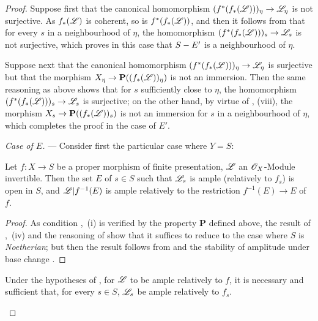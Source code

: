 \begin{proof}
Suppose first that the canonical homomorphism $(f^*(f_*(\mathscr{L})))_\eta\to\mathscr{L}_\eta$ is not surjective.
As $f_*(\mathscr{L})$ is coherent, so is $f^*(f_*(\mathscr{L}))$, and then it follows from  that for every $s$ in a neighbourhood of $\eta$, the homomorphism $(f^*(f_*(\mathscr{L})))_s\to\mathscr{L}_s$ is not surjective, which proves in this case that $S- E'$ is a neighbourhood of $\eta$.

Suppose next that the canonical homomorphism $(f^*(f_*(\mathscr{L})))_\eta\to\mathscr{L}_\eta$ is surjective but that the morphism $X_\eta\to\mathbf{P}((f_*(\mathscr{L}))_\eta)$ is not an immersion.
Then the same reasoning as above shows that for $s$ sufficiently close to $\eta$, the homomorphism $(f^*(f_*(\mathscr{L})))_s\to\mathscr{L}_s$ is surjective; on the other hand, by virtue of , (viii), the morphism $X_s\to\mathbf{P}((f_*(\mathscr{L}))_s)$ is not an immersion for $s$ in a neighbourhood of $\eta$, which completes the proof in the case of $E'$.

\emph{Case of $E$.} --- Consider first the particular case where $Y=S$:

\begin{corollary}[9.6.4]
\label{IV.9.6.4}
Let $f:X\to S$ be a \textup{proper} morphism of finite presentation, $\mathscr{L}$ an $\mathscr{O}_X$-Module invertible.
Then the set $E$ of $s\in S$ such that $\mathscr{L}_s$ is ample (relatively to $f_s$) is open in $S$, and $\mathscr{L}|f^{-1}(E)$ is ample relatively to the restriction $f^{-1}(E)\to E$ of $f$.
\end{corollary}

\begin{proof}
As condition ,~(i) is verified by the property $\boldsymbol{P}$ defined above, the result of ,~(iv) and the reasoning of  show that it suffices to reduce to the case where $S$ is \emph{Noetherian}; but then the result follows from  and the stability of amplitude under base change .
\end{proof}

\begin{corollary}[9.6.5]
\label{IV.9.6.5}
Under the hypotheses of , for $\mathscr{L}$ to be ample relatively to $f$, it is necessary and sufficient that, for every $s\in S$, $\mathscr{L}_s$ be ample relatively to $f_s$.
\end{corollary}


\end{proof}
